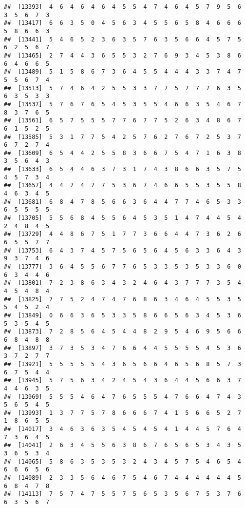 \documentclass[
]{book}
\begin{document}
\begin{verbatim}
##  [13393]  4  6  4  6  4  6  4  5  5  4  7  4  6  4  5  7  9  5  6  3  5  6  7  3
##  [13417]  6  6  3  5  0  4  5  6  3  4  5  5  6  5  8  4  6  6  6  5  8  6  6  3
##  [13441]  5  4  6  5  2  3  6  3  5  7  6  3  5  6  6  4  5  7  5  6  2  5  6  7
##  [13465]  2  7  4  4  3  6  5  5  3  2  7  6  9  3  4  5  3  8  6  6  4  6  6  5
##  [13489]  5  1  5  8  6  7  3  6  4  5  5  4  4  4  3  3  7  4  7  5  5  6  7  4
##  [13513]  5  7  4  6  4  2  5  5  3  3  7  7  5  7  7  7  6  3  5  6  3  5  3  3
##  [13537]  5  7  6  7  6  5  4  5  3  5  5  4  6  6  3  5  4  6  7  8  3  7  6  5
##  [13561]  6  5  7  5  5  5  7  7  6  7  7  5  2  6  3  4  8  6  7  6  1  5  2  5
##  [13585]  5  3  1  7  7  5  4  2  5  7  6  2  7  6  7  2  5  3  7  6  7  2  7  4
##  [13609]  6  5  4  4  2  5  5  8  3  6  6  7  5  4  7  1  6  3  8  3  5  6  4  3
##  [13633]  6  5  4  4  6  3  7  3  1  7  4  3  8  6  6  3  5  7  5  4  5  7  3  4
##  [13657]  4  4  7  4  7  7  5  3  6  7  4  6  6  5  5  3  5  5  8  4  6  3  4  5
##  [13681]  6  8  4  7  8  5  6  6  3  6  4  4  7  7  4  6  5  3  3  6  5  5  5  5
##  [13705]  5  5  6  8  4  5  5  6  4  5  3  5  1  4  7  4  4  5  4  2  4  8  4  5
##  [13729]  4  4  8  6  7  5  1  7  7  3  6  6  4  4  7  3  6  2  6  6  5  5  7  7
##  [13753]  6  4  3  7  4  5  7  5  6  5  6  4  5  6  3  3  6  4  3  9  3  7  4  6
##  [13777]  3  6  4  5  5  6  7  7  6  5  3  3  5  3  5  3  3  6  0  6  3  4  4  6
##  [13801]  7  2  3  8  6  3  4  3  2  4  6  4  3  7  7  7  3  5  4  4  5  4  8  4
##  [13825]  7  7  5  2  4  7  4  7  6  8  6  3  4  6  4  5  5  3  5  5  4  5  2  4
##  [13849]  0  6  6  3  6  5  3  3  5  8  6  6  5  6  3  4  5  3  6  5  3  5  4  5
##  [13873]  7  2  8  5  6  4  5  4  4  8  2  9  5  4  6  9  5  6  6  6  8  4  8  8
##  [13897]  3  7  3  5  3  4  7  6  6  4  4  5  5  5  5  4  5  3  6  3  7  2  7  7
##  [13921]  5  5  5  5  5  4  3  6  5  6  6  4  6  5  6  8  5  7  3  6  7  5  4  4
##  [13945]  5  7  5  6  3  4  2  4  5  4  3  6  4  4  5  6  6  3  7  4  4  6  3  5
##  [13969]  5  5  5  4  6  4  7  6  5  5  5  4  7  6  6  4  7  4  3  5  6  5  4  5
##  [13993]  1  3  7  7  5  7  8  6  6  6  7  4  1  5  6  6  5  2  7  1  8  6  5  5
##  [14017]  3  4  6  3  6  3  5  4  5  4  5  4  1  4  4  5  7  6  4  7  3  6  4  5
##  [14041]  2  6  3  4  5  5  6  3  8  6  7  6  5  6  5  3  4  3  5  3  6  5  3  4
##  [14065]  5  8  6  3  5  3  5  3  2  4  3  4  5  7  5  4  6  5  4  6  6  6  5  6
##  [14089]  2  3  3  5  6  4  6  7  5  4  6  7  4  4  4  4  4  4  5  6  8  4  7  8
##  [14113]  7  5  7  4  7  5  5  7  5  6  5  3  5  6  7  5  3  7  6  6  3  5  6  7

\end{verbatim}
\end{document}
